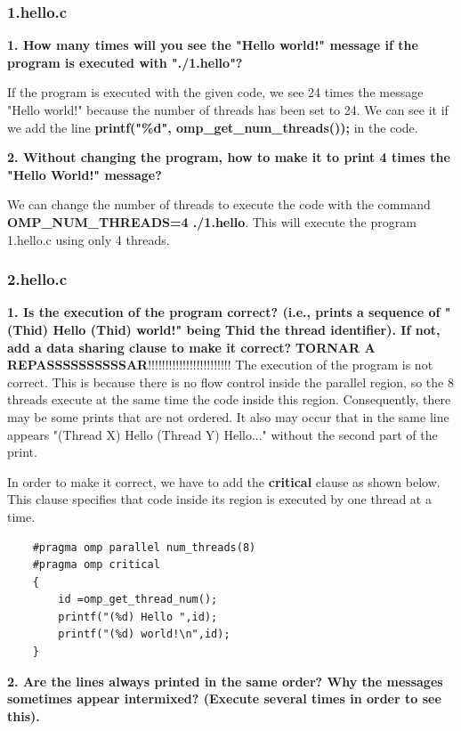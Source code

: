 \documentclass[12pt, a4paper]{article}
\begin{document}
\subsubsection{1.hello.c}

\textbf{1. How many times will you see the "Hello world!" message if the program is executed with "./1.hello"?}

If the program is executed with the given code, we see 24 times the message "Hello world!" because the number of threads has been set to 24. We can see it if we add the line \textbf{printf("\%d", omp\_get\_num\_threads());} in the code.

\hfill

\textbf{2. Without changing the program, how to make it to print 4 times the "Hello World!" message?}

We can change the number of threads to execute the code with the command \textbf{OMP\_NUM\_THREADS=4 ./1.hello}. This will execute the program 1.hello.c using only 4 threads.

\subsubsection{2.hello.c}

\textbf{1. Is the execution of the program correct? (i.e., prints a sequence of "(Thid) Hello (Thid)
world!" being Thid the thread identifier). If not, add a data sharing clause to make it correct?}
\textbf{TORNAR A REPASSSSSSSSSSAR}!!!!!!!!!!!!!!!!!!!!!!!!
The execution of the program is not correct. This is because there is no flow control inside the parallel region, so the 8 threads execute at the same time the code inside this region. Consequently, there may be some prints that are not ordered. It also may occur that in the same line appears "(Thread X) Hello (Thread Y) Hello..." without the second part of the print.

In order to make it correct, we have to add the \textbf{critical} clause as shown below. This clause specifies that code inside its region is executed by one thread at a time.

\begin{lstlisting}
	#pragma omp parallel num_threads(8)
	#pragma omp critical
	{
	    id =omp_get_thread_num();
	    printf("(%d) Hello ",id);
	    printf("(%d) world!\n",id);
	}
\end{lstlisting}

\hfill

\textbf{2. Are the lines always printed in the same order? Why the messages sometimes appear intermixed? (Execute several times in order to see this).}
\end{document}
